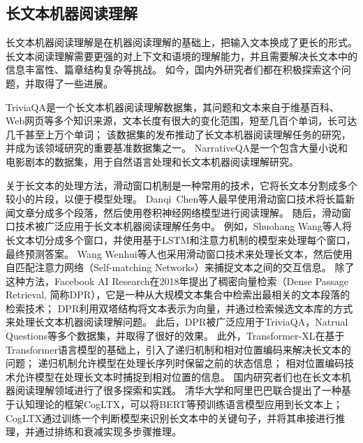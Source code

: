 \subsection{长文本机器阅读理解}
长文本机器阅读理解是在机器阅读理解的基础上，把输入文本换成了更长的形式。
长文本阅读理解需要更强的对上下文和语境的理解能力，并且需要解决长文本中的信息丰富性、篇章结构复杂等挑战。
如今，国内外研究者们都在积极探索这个问题，并取得了一些进展。

TriviaQA\cite{Joshi2017TriviaQAAL}是一个长文本机器阅读理解数据集，其问题和文本来自于维基百科、Web网页等多个知识来源，文本长度有很大的变化范围，短至几百个单词，长可达几千甚至上万个单词；
该数据集的发布推动了长文本机器阅读理解任务的研究，并成为该领域研究的重要基准数据集之一。
NarrativeQA\cite{Kocisk2017TheNR}是一个包含大量小说和电影剧本的数据集，用于自然语言处理和长文本机器阅读理解研究。

关于长文本的处理方法，滑动窗口\cite{joshi2019bert}机制是一种常用的技术，它将长文本分割成多个较小的片段，以便于模型处理。
Danqi\ Chen等人\cite{Chen2016ATE}最早使用滑动窗口技术将长篇新闻文章分成多个段落，然后使用卷积神经网络模型进行阅读理解。
随后，滑动窗口技术被广泛应用于长文本机器阅读理解任务中。
例如，Shuohang Wang等人\cite{Wang2016MachineCU}将长文本切分成多个窗口，并使用基于LSTM和注意力机制的模型来处理每个窗口，最终预测答案。
Wang Wenhui等人\cite{wang2017r}也采用滑动窗口技术来处理长文本，然后使用自匹配注意力网络\cite{Wang2017GatedSN}（Self-matching Networks）来捕捉文本之间的交互信息。
除了这种方法，Facebook AI Research在2018年提出了稠密向量检索\cite{Karpukhin2020DensePR}（Dense Passage Retrieval, 简称DPR），它是一种从大规模文本集合中检索出最相关的文本段落的检索技术；
DPR利用双塔结构将文本表示为向量，并通过检索候选文本库的方式来处理长文本机器阅读理解问题。
此后，DPR被广泛应用于TriviaQA，Natrual Questions等多个数据集，并取得了很好的效果。
此外，Transformer-XL\cite{Dai2019TransformerXLAL}在基于Transformer\cite{vaswani2017attention}语言模型的基础上，引入了递归机制和相对位置编码来解决长文本的问题；
递归机制允许模型在处理长序列时保留之前的状态信息；
相对位置编码技术允许模型在处理长文本时捕捉到相对位置的信息。
国内研究者们也在长文本机器阅读理解领域进行了很多探索和实践。
清华大学和阿里巴巴联合提出了一种基于认知理论的框架CogLTX\cite{Ding2020CogLTXAB}，可以将BERT等预训练语言模型应用到长文本上；
CogLTX通过训练一个判断模型来识别长文本中的关键句子，并将其串接进行推理，并通过排练和衰减实现多步骤推理。


